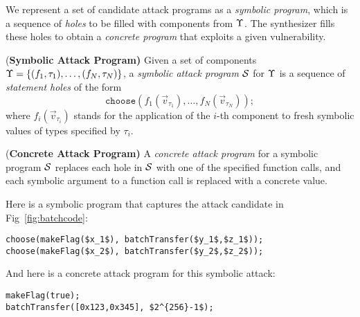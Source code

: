 We represent a set of candidate attack programs as a \emph{symbolic program}, 
which is a sequence of \emph{holes} to be filled with components from $\Upsilon$. 
The synthesizer fills these holes to obtain 
a \emph{concrete program} that exploits a given vulnerability.
\begin{definition}{{(\bf Symbolic Attack Program)}}\label{def:symbolic-attack}
Given a set of components $\Upsilon=\{(f_1,\tau_1),\ldots,(f_N,\tau_N)\}$, a \emph{symbolic attack program} $\mathcal{S}$ 
for $\Upsilon$ is a sequence of \emph{statement holes} of the form
$$
\mathtt{choose}(f_1({\vec{v}_{\tau_1}}), \ldots, f_N({\vec{v}_{\tau_N}}));
$$
where $f_i({\vec{v}_{\tau_i}})$ stands for the application of the
$i$-th component to fresh symbolic values of types specified by $\tau_i$. 
\end{definition}
\begin{definition}{{(\bf Concrete Attack Program)}}
A \emph{concrete attack program} for a symbolic program $\mathcal{S}$ 
replaces each hole in $\mathcal{S}$ with one of the specified function calls, 
and each symbolic argument to a function call is replaced with a concrete value.
\end{definition}
\begin{example}
Here is a symbolic program that captures the attack candidate in
Fig~\ref{fig:batchcode}:
\begin{lstlisting}[numbers=none,frame=none,basicstyle=\footnotesize\ttfamily]
choose(makeFlag($x_1$), batchTransfer($y_1$,$z_1$));  
choose(makeFlag($x_2$), batchTransfer($y_2$,$z_2$)); 
\end{lstlisting}
And here is a concrete attack program for this symbolic attack:  
\begin{lstlisting}[numbers=none,frame=none,basicstyle=\footnotesize\ttfamily]
makeFlag(true); 
batchTransfer([0x123,0x345], $2^{256}-1$);  
\end{lstlisting}

\end{example}

